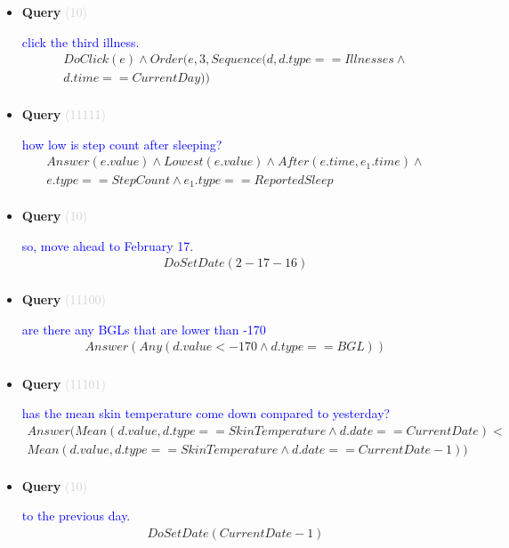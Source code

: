 \documentclass[11pt]{article}
\newcommand{\key}[1]{\textcolor{lightgray}{#1}}
\newcounter{CQuery}
\begin{document}
\begin{itemize}
\item
\textbf{Query\theCQuery} \key{(10)} \addtocounter{CQuery}{1}
\textcolor{blue}{ click the third illness. }
\begin{multline*}
DoClick(e) \wedge  Order(e, 3, Sequence(d, d.type==Illnesses \wedge \\ 
d.time==CurrentDay)) \\ 
\end{multline*}


\item
\textbf{Query\theCQuery} \key{(11111)} \addtocounter{CQuery}{1}
\textcolor{blue}{ how low is step count after sleeping? }
\begin{multline*}
Answer(e.value) \wedge Lowest(e.value) \wedge After(e.time, e_1.time) \wedge \\ 
e.type==StepCount \wedge e_1.type==ReportedSleep \\ 
\end{multline*}


\item
\textbf{Query\theCQuery} \key{(10)} \addtocounter{CQuery}{1}
\textcolor{blue}{ so, move ahead to February 17. }
\begin{multline*}
DoSetDate(2-17-16) \\ 
\end{multline*}


\item
\textbf{Query\theCQuery} \key{(11100)} \addtocounter{CQuery}{1}
\textcolor{blue}{ are there any BGLs that are lower than -170 }
\begin{multline*}
Answer(Any(d.value<-170 \wedge d.type==BGL)) \\ 
\end{multline*}


\item
\textbf{Query\theCQuery} \key{(11101)} \addtocounter{CQuery}{1}
\textcolor{blue}{ has the mean skin temperature come down compared to yesterday? }
\begin{multline*}
Answer(Mean(d.value, d.type==SkinTemperature \wedge d.date==CurrentDate) < \\ 
Mean(d.value, d.type==SkinTemperature \wedge d.date==CurrentDate-1)) \\ 
\end{multline*}


\item
\textbf{Query\theCQuery} \key{(10)} \addtocounter{CQuery}{1}
\textcolor{blue}{ to the previous day. }
\begin{multline*}
DoSetDate(CurrentDate - 1) \\ 
\end{multline*}



\end{itemize}
\end{document}
